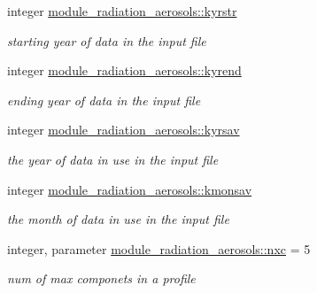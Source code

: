 \begin{DoxyCompactItemize}
integer \hyperlink{group__module__radiation__aerosols_gaf224f7d7991e3d48aeaa4d221da50f41}{module\+\_\+radiation\+\_\+aerosols\+::kyrstr}
\begin{DoxyCompactList}\small\item\em starting year of data in the input file \end{DoxyCompactList}\item 
\mbox{\label{group__module__radiation__aerosols_ga79127786cce93bccf8749ef8c85f6467}} 
integer \hyperlink{group__module__radiation__aerosols_ga79127786cce93bccf8749ef8c85f6467}{module\+\_\+radiation\+\_\+aerosols\+::kyrend}
\begin{DoxyCompactList}\small\item\em ending year of data in the input file \end{DoxyCompactList}\item 
\mbox{\label{group__module__radiation__aerosols_ga928c08857f866e4b848873a23a1d49e7}} 
integer \hyperlink{group__module__radiation__aerosols_ga928c08857f866e4b848873a23a1d49e7}{module\+\_\+radiation\+\_\+aerosols\+::kyrsav}
\begin{DoxyCompactList}\small\item\em the year of data in use in the input file \end{DoxyCompactList}\item 
\mbox{\label{group__module__radiation__aerosols_ga302ae8a5aa2b8fb08ad366ef124cee45}} 
integer \hyperlink{group__module__radiation__aerosols_ga302ae8a5aa2b8fb08ad366ef124cee45}{module\+\_\+radiation\+\_\+aerosols\+::kmonsav}
\begin{DoxyCompactList}\small\item\em the month of data in use in the input file \end{DoxyCompactList}\item 
\mbox{\label{group__module__radiation__aerosols_ga1fffbb55ad2986a216b721a6c103c4cf}} 
integer, parameter \hyperlink{group__module__radiation__aerosols_ga1fffbb55ad2986a216b721a6c103c4cf}{module\+\_\+radiation\+\_\+aerosols\+::nxc} = 5
\begin{DoxyCompactList}\small\item\em num of max componets in a profile \end{DoxyCompactList}\item 

\end{DoxyCompactItemize}

